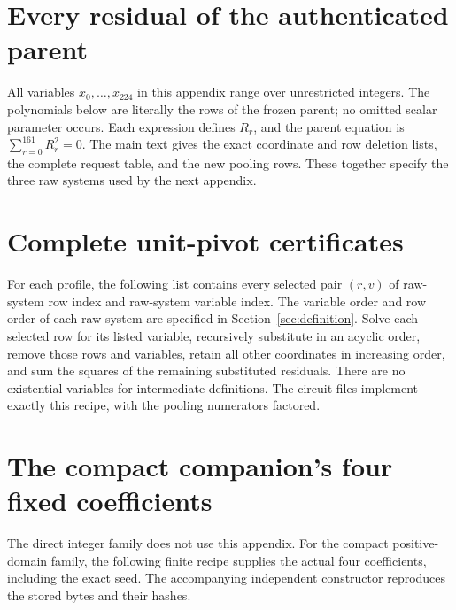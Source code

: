 \documentclass[11pt]{article}
\theoremstyle{definition}\newtheorem{definition}[theorem]{Definition}
\theoremstyle{remark}\newtheorem{remark}[theorem]{Remark}
\begin{document}
\appendix
\section{Every residual of the authenticated parent}
\label{app:parent}
All variables $x_0,\ldots,x_{224}$ in this appendix range over unrestricted
integers. The polynomials below are literally the rows of the frozen
parent; no omitted scalar parameter occurs. Each expression defines
$R_r$, and the parent equation is $\sum_{r=0}^{161}R_r^2=0$.
The main text gives the exact coordinate and row deletion lists, the
complete request table, and the new pooling rows. These together specify
the three raw systems used by the next appendix.


\section{Complete unit-pivot certificates}
\label{app:pivots}
For each profile, the following list contains every selected pair
$(r,v)$ of raw-system row index and raw-system variable index. The
variable order and row order of each raw system are specified in
Section~\ref{sec:definition}. Solve each selected row for its listed
variable, recursively substitute in an acyclic order, remove those rows
and variables, retain all other coordinates in increasing order, and sum
the squares of the remaining substituted residuals. There are no
existential variables for intermediate definitions. The circuit files
implement exactly this recipe, with the pooling numerators factored.


\section{The compact companion's four fixed coefficients}
\label{app:coefficients}
The direct integer family does not use this appendix. For the compact
positive-domain family, the following finite recipe supplies the actual
four coefficients, including the exact seed. The accompanying independent
constructor reproduces the stored bytes and their hashes.

\end{document}
